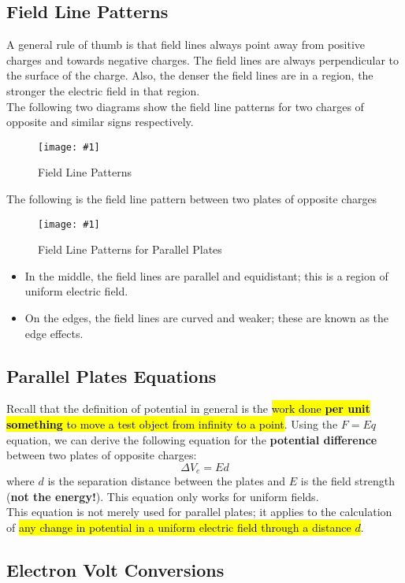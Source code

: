 \documentclass[a4paper,12pt]{article}
\newcommand{\lb}{\\[8pt]}
\newcommand{\img}[4]{\begin{center}
  \begin{figure}[H]
    \centering
    \texttt{[image: \#1]}
    \caption{#3}
    \label{fig:#4}
  \end{figure}
\end{center}}
\begin{document}
\pagebreak

\subsection{Field Line Patterns}

A general rule of thumb is that field lines always point away from positive charges and towards negative charges. The field lines are always perpendicular to the surface of the charge. Also, the denser the field lines are in a region, the stronger the electric field in that region.\lb
The following two diagrams show the field line patterns for two charges of opposite and similar signs respectively.
\img{fieldlines.jpg}{0.8}{Field Line Patterns}{fieldlines}

The following is the field line pattern between two plates of opposite charges
\img{plates.jpeg}{0.4}{Field Line Patterns for Parallel Plates}{plates}
\begin{itemize}
  \item In the middle, the field lines are parallel and equidistant; this is a region of uniform electric field.
  \item On the edges, the field lines are curved and weaker;  these are known as the edge effects.
\end{itemize}

\subsection{Parallel Plates Equations}

Recall that the definition of potential in general is the \hl{work done \textbf{per unit something} to move a test object from infinity to a point}. Using the $F = Eq$ equation, we can derive the following equation for the \textbf{potential difference} between two plates of opposite charges:
\begin{equation}\label{eq:plates}
  \Delta V_e = Ed
\end{equation}
where $d$ is the separation distance between the plates and $E$ is the field strength (\textbf{not the energy!}). This equation only works for uniform fields.\lb
This equation is not merely used for parallel plates; it applies to the calculation of \hl{any change in potential in a uniform electric field through a distance $d$}.

\subsection{Electron Volt Conversions}
\end{document}
